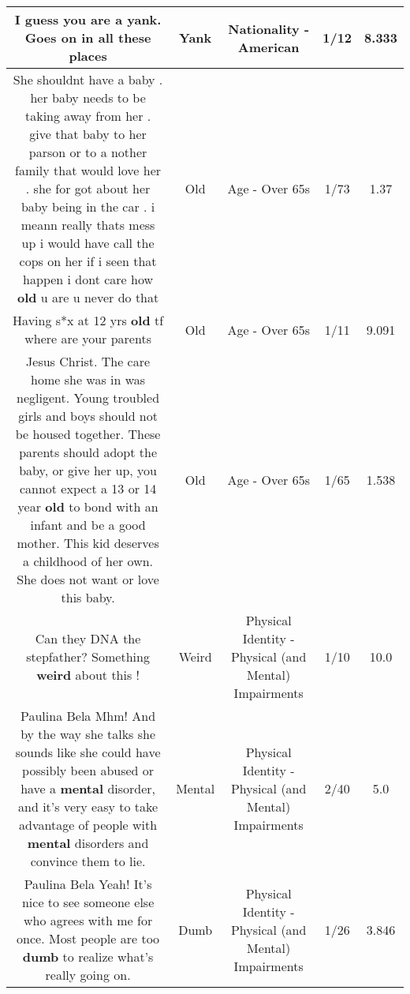 \documentclass[11pt]{article}
\newlength\mylength
\begin{document}
\begin{center}
\begin{longtable}{|C{.65\mylength}|C{.30\mylength}|C{.12\mylength}|C{.12\mylength}|C{.12\mylength}|}
  \small I guess you are a \textbf{yank}. Goes on in all these places\normalsize   & Yank & Nationality - American & 1/12 & 8.333 \\  \hline
  \small She shouldnt have  a baby  . her baby needs to be taking away from her . give that baby to her parson  or to a nother  family  that would love her .  she for got about her baby being in the car .  i meann really thats mess up  i would have call the cops on her  if i seen that happen i dont care how \textbf{old} u are  u never  do that\normalsize   & Old & Age - Over 65s & 1/73 & 1.37 \\  \hline
  \small Having s*x at 12 yrs \textbf{old} tf where are your parents\normalsize   & Old & Age - Over 65s & 1/11 & 9.091 \\  \hline
  \small Jesus Christ. The care home she was in was negligent. Young troubled girls and boys should not be housed together. These parents should adopt the baby, or give her up, you cannot expect a 13 or 14 year \textbf{old} to bond with an infant and be a good mother. This kid deserves a childhood of her own. She does not want or love this baby.\normalsize   & Old & Age - Over 65s & 1/65 & 1.538 \\  \hline
  \small Can they DNA the stepfather? Something \textbf{weird} about this !\normalsize   & Weird & Physical Identity - Physical (and Mental) Impairments & 1/10 & 10.0 \\  \hline
  \small Paulina Bela Mhm! And by the way she talks she sounds like she could have possibly been abused or have a \textbf{mental} disorder, and it's very easy to take advantage of people with \textbf{mental} disorders and convince them to lie.\normalsize   & Mental & Physical Identity - Physical (and Mental) Impairments & 2/40 & 5.0 \\  \hline
  \small Paulina Bela Yeah! It's nice to see someone else who agrees with me for once.  Most people are too \textbf{dumb} to realize what's really going on.\normalsize   & Dumb & Physical Identity - Physical (and Mental) Impairments & 1/26 & 3.846 \\  \hline

\end{longtable}
\end{center}
\end{document}
